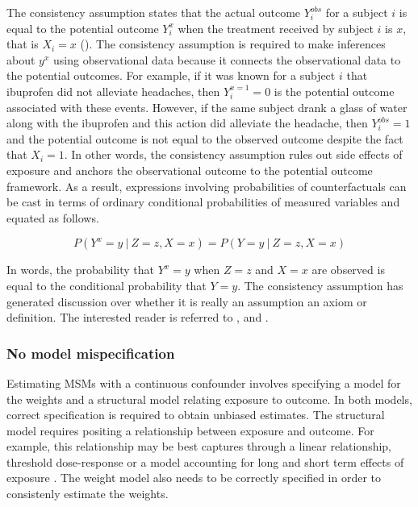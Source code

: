 \documentclass[11pt]{article}
\begin{document}
The consistency assumption states that the actual outcome
\(Y_{i}^{obs}\) for a subject \(i\) is equal to the potential outcome
\(Y_{i}^{x}\) when the treatment received by subject \(i\) is \(x\),
that is \(X_i = x\) (\citet{Cole2009}). The consistency assumption is
required to make inferences about \(y^{x}\) using observational data
because it connects the observational data to the potential outcomes.
For example, if it was known for a subject \(i\) that ibuprofen did not
alleviate headaches, then \(Y_{i}^{x=1} = 0\) is the potential outcome
associated with these events. However, if the same subject drank a glass
of water along with the ibuprofen and this action did alleviate the
headache, then \(Y_{i}^{obs} = 1\) and the potential outcome is not
equal to the observed outcome despite the fact that \(X_i=1\). In other
words, the consistency assumption rules out side effects of exposure and
anchors the observational outcome to the potential outcome framework. As
a result, expressions involving probabilities of counterfactuals can be
cast in terms of ordinary conditional probabilities of measured
variables \citet{Pearl2010} and equated as follows.

\[P(Y^x = y\ |\ Z = z, X = x) = P(Y = y\ |\ Z = z, X = x)\]

In words, the probability that \(Y^x = y\) when \(Z = z\) and \(X = x\)
are observed is equal to the conditional probability that \(Y = y\). The
consistency assumption has generated discussion over whether it is
really an assumption an axiom or definition. The interested reader is
referred to \citet{VanderWeele2009}, \citet{Cole2009} and
\citet{Pearl2010}.

\subsubsection{No model mispecification}\label{no-model-mispecification}

Estimating MSMs with a continuous confounder involves specifying a model
for the weights and a structural model relating exposure to outcome. In
both models, correct specification is required to obtain unbiased
estimates. The structural model requires positing a relationship between
exposure and outcome. For example, this relationship may be best
captures through a linear relationship, threshold dose-response or a
model accounting for long and short term effects of exposure
\citet{Cole2009}. The weight model also needs to be correctly specified
in order to consistenly estimate the weights.
\end{document}
